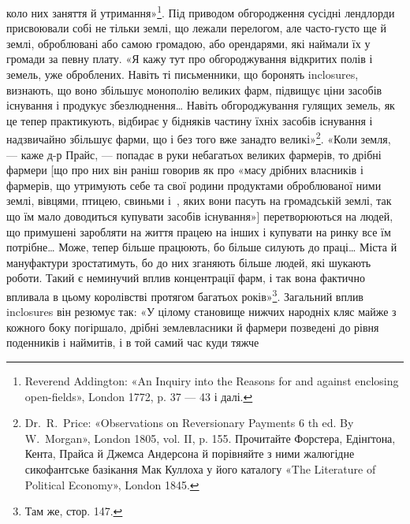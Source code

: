 \parcont{}  %
коло них заняття й утримання»\footnote{
Reverend Addington: «An Inquiry into the Reasons for and against
enclosing open-fields», London 1772, p. 37 — 43 і далі.
}. Під приводом обгородження
сусідні лендлорди присвоювали собі не тільки землі, що лежали
перелогом, але часто-густо ще й землі, оброблювані або самою
громадою, або орендарями, які наймали їх у громади за певну
плату. «Я кажу тут про обгороджування відкритих полів і земель,
уже оброблених. Навіть ті письменники, що боронять
inclosures, визнають, що воно збільшує монополію великих
фарм, підвищує ціни засобів існування і продукує збезлюднення\dots{}
Навіть обгороджування гулящих земель, як це тепер практикують,
відбирає у бідняків частину їхніх засобів існування і надзвичайно
збільшує фарми, що і без того вже занадто великі»\footnote{
Dr.~R.~Price: «Observations on Reversionary Payments 6 th ed.
By W.~Morgan», London 1805, vol. II, p. 155. Прочитайте Форстера,
Едінґтона, Кента, Прайса й Джемса Андерсона й порівняйте з ними жалюгідне
сикофантське базікання Мак Куллоха у його каталогу «The
Literature of Political Economy», London 1845.
}.
«Коли земля, — каже д-р Прайс, — попадає в руки небагатьох
великих фармерів, то дрібні фармери [що про них він раніш говорив
як про «масу дрібних власників і фармерів, що утримують
себе та свої родини продуктами оброблюваної ними землі, вівцями,
птицею, свиньми і~, яких вони пасуть на громадській
землі, так що їм мало доводиться купувати засобів існування»]
перетворюються на людей, що примушені заробляти на життя
працею на інших і купувати на ринку все їм потрібне\dots{} Може,
тепер більше працюють, бо більше силують до праці\dots{} Міста й
мануфактури зростатимуть, бо до них зганяють більше людей,
які шукають роботи. Такий є неминучий вплив концентрації
фарм, і так вона фактично впливала в цьому королівстві протягом
багатьох років»\footnote{
Там же, стор. 147.
}. Загальний вплив inclosures він резюмує
так: «У цілому становище нижчих народніх кляс майже з
кожного боку погіршало, дрібні землевласники й фармери позведені
до рівня поденників і наймитів, і в той самий час куди тяжче
